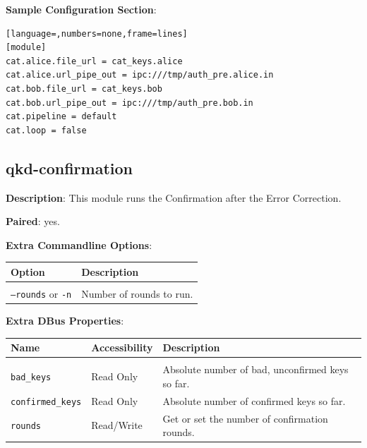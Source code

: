 \bigskip

\noindent \textbf{Sample Configuration Section}: 

\medskip

\begin{lstlisting}[language=,numbers=none,frame=lines]
[module]
cat.alice.file_url = cat_keys.alice
cat.alice.url_pipe_out = ipc:///tmp/auth_pre.alice.in
cat.bob.file_url = cat_keys.bob
cat.bob.url_pipe_out = ipc:///tmp/auth_pre.bob.in
cat.pipeline = default
cat.loop = false
\end{lstlisting}

\clearpage


\subsection{qkd-confirmation}
\label{subsec:qkd-confirmation}

\textbf{Description}: This module runs the Confirmation after the Error Correction.

\bigskip

\noindent \textbf{Paired}: yes.

\bigskip

\noindent \textbf{Extra Commandline Options}:

\medskip

\begin{tabular}{lp{10cm}}

Option                              & Description \\
\hline
\\
\texttt{--rounds} or \texttt{-n}    & Number of rounds to run. \\ [0.5em]

\end{tabular}

\bigskip

\noindent \textbf{Extra DBus Properties}:

\medskip

\begin{tabular}{llp{7cm}}

Name                        & Accessibility &   Description \\
\hline
\\
\texttt{bad\_keys}          & Read Only     &   Absolute number of bad, unconfirmed keys so far. \\ [0.5em]
\texttt{confirmed\_keys}    & Read Only     &   Absolute number of confirmed keys so far. \\ [0.5em]
\texttt{rounds}             & Read/Write    &   Get or set the number of confirmation rounds. \\ [0.5em]

\end{tabular}

